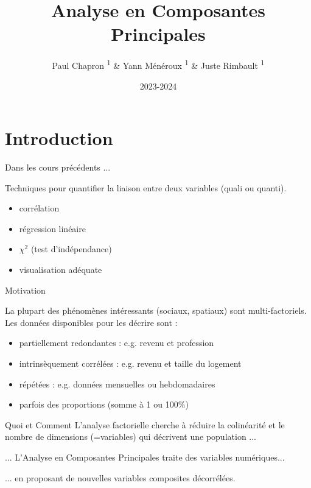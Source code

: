 \documentclass{beamer}
\title{Analyse en Composantes Principales}
\subtitle{}
\date{2023-2024}
\author{Paul Chapron \textsuperscript{1} \& Yann Ménéroux \textsuperscript{1} \& Juste Rimbault \textsuperscript{1}}
\institute{ \textsuperscript{1}IGN-ENSG-UGE}
\begin{document}
\maketitle	

\section{Introduction} 

\begin{frame}{Dans les cours précédents ... }


Techniques pour quantifier la liaison entre \alert{deux} variables (quali ou quanti). 

\begin{itemize}
\item corrélation
\item régression linéaire
\item $\chi^2$  (test d'indépendance)
\item visualisation adéquate 
\end{itemize}

\end{frame}


\begin{frame}{Motivation}


La plupart des phénomènes intéressants (sociaux, spatiaux) sont \alert{multi-factoriels}. Les données disponibles pour les décrire sont :

\begin{itemize}
	\item partiellement \alert{redondantes}  :   e.g. revenu et profession
	\item intrinsèquement \alert{corrélées} : e.g. revenu et taille du logement
  \item répétées : e.g. données mensuelles ou hebdomadaires
	\item parfois des proportions (somme à 1 ou 100\%)
\end{itemize}
\end{frame}




\begin{frame}{Quoi et Comment}
L'analyse \alert{factorielle}  cherche à réduire la \alert{colinéarité} et le \alert{nombre de dimensions} (=variables) qui décrivent une population ... 

\medskip \medskip
... L'\alert{Analyse en Composantes Principales} traite des variables \alert{numériques}...

\medskip \medskip

... en proposant de nouvelles variables \alert{composites décorrélées}.
\end{frame}
\end{document}
